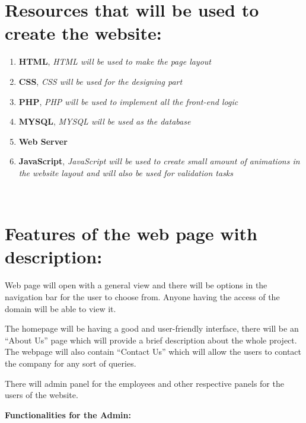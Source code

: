 \documentclass[12pt,a4paper]{article}
\begin{document}
\section*{{Resources that will be used to create the website:}}
\begin{enumerate}
\item {\large \textbf{HTML}}, \textit{HTML will be used to make the page layout}
\item {\large \textbf{CSS}}, \textit{CSS will be used for the designing part}
\item {\large \textbf{PHP}}, \textit{PHP will be used to implement all the front-end logic}
\item {\large \textbf{MYSQL}}, \textit{MYSQL will be used as the database}
\item {\large \textbf{Web Server}}
\item {\large \textbf{JavaScript}}, \textit{JavaScript will be used to create small amount of animations in the website layout and will also be used for validation tasks}
\end{enumerate}

\newpage
 \,
\section*{\textbf{{\Large Features of the web page with description:}}}
\begin{flushleft}
Web page will open with a general view and there will be options in the navigation bar for the user to choose from. Anyone having the access of the domain will be able to view it.
\end{flushleft}
\begin{flushright}
The homepage will be having a good and user-friendly interface, there will be an “About Us” page which will provide a brief description about the whole project. The webpage will also contain “Contact Us” which will allow the users to contact the company for any sort of queries.
\end{flushright}
\begin{flushleft}
There will admin panel for the employees and other respective panels for the users of the website.
\end{flushleft}
\vspace{0.5cm}
\textbf{Functionalities for the Admin:}
\end{document}
